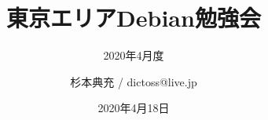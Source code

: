 \title{東京エリアDebian勉強会}
\subtitle{2020年4月度} %
\author{杉本典充 / dictoss@live.jp}
\date{2020年4月18日}



\begin{frame}
\titlepage{}
\end{frame}


